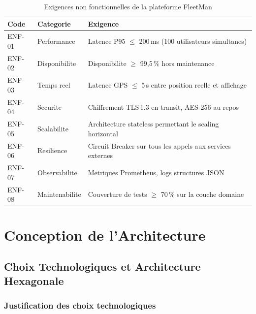 \documentclass[12pt,a4paper]{report}
\begin{document}
\begin{table}[H]
\caption{Exigences non fonctionnelles de la plateforme FleetMan}
\label{tab:enf}
\centering
\begin{tabularx}{\textwidth}{p{2cm}p{3cm}X}
\toprule
\textbf{Code} & \textbf{Categorie} & \textbf{Exigence} \\
\midrule
ENF-01 & Performance   & Latence P95 $\leq$ 200\,ms (100 utilisateurs simultanes) \\
ENF-02 & Disponibilite & Disponibilite $\geq$ 99,5\,\% hors maintenance \\
ENF-03 & Temps reel    & Latence GPS $\leq$ 5\,s entre position reelle et affichage \\
ENF-04 & Securite      & Chiffrement TLS\,1.3 en transit, AES-256 au repos \\
ENF-05 & Scalabilite   & Architecture stateless permettant le scaling horizontal \\
ENF-06 & Resilience    & Circuit Breaker sur tous les appels aux services externes \\
ENF-07 & Observabilite & Metriques Prometheus, logs structures JSON \\
ENF-08 & Maintenabilite& Couverture de tests $\geq$ 70\,\% sur la couche domaine \\
\bottomrule
\end{tabularx}
\end{table}

\part{Conception de l'Architecture}

\chapter{Choix Technologiques et Architecture Hexagonale}

\section{Justification des choix technologiques}
\end{document}

